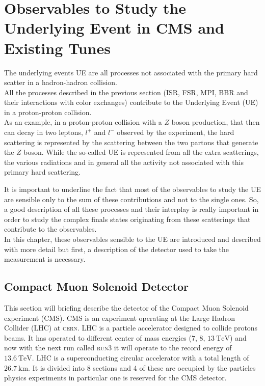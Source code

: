 
\chapter{Observables to Study the Underlying Event in CMS and Existing Tunes}
\label{chap:ObservabletoStudytheUnderlyingEvent}

The underlying events UE are all processes not associated with the primary hard scatter in a hadron-hadron collision.
\\
All the processes described in the previous section (ISR, FSR, MPI, BBR and their interactions with color exchanges) contribute to the Underlying Event (UE) in a proton-proton collision.
\\
As an example, in a proton-proton collision with a $Z$ boson production, that then can decay in two leptons, $l^+$ and $l^-$ observed by the experiment,  the hard scattering is represented by the scattering between the two partons that generate the $Z$ boson. While the so-called UE is represented from all the extra scatterings, the various radiations and in general all the activity not associated with this primary hard scattering.  

\medskip

It is important to underline the fact that most of the observables to study the UE are sensible only to the sum of these contributions and not to the single ones. So, a good description of all these processes and their interplay is really important in order to study the complex finals states originating from these scatterings that contribute to the observables.
\\
In this chapter, these observables sensible to the UE are introduced and described with more detail but first, a description of the detector used to take the measurement is necessary.


\section{Compact Muon Solenoid Detector}

This section will briefing describe the detector of the Compact Muon Solenoid experiment (CMS). CMS is an experiment operating at the Large Hadron Collider (LHC) at \textsc{cern}. LHC is a particle accelerator designed to collide protons beams. It has operated to different center of mass energies ($7$, $8$, $13\ \mathrm{TeV}$) and now with the next run called \textsc{run3} it will operate to the record energy of $13.6\ \mathrm{TeV}$. LHC is a superconducting circular accelerator with a total length of $26.7\ \mathrm{km}$. It is divided into 8 sections and 4 of these are occupied by the particles physics experiments in particular one is reserved for the CMS detector.

